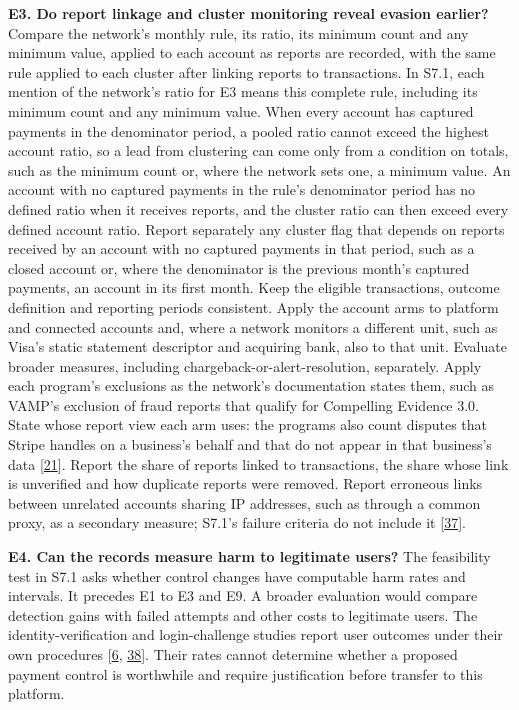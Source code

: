 \documentclass[
  11pt,
]{article}
\begin{document}
\textbf{E3. Do report linkage and cluster monitoring reveal evasion
earlier?} Compare the network's monthly rule, its ratio, its minimum
count and any minimum value, applied to each account as reports are
recorded, with the same rule applied to each cluster after linking
reports to transactions. In S7.1, each mention of the network's ratio
for E3 means this complete rule, including its minimum count and any
minimum value. When every account has captured payments in the
denominator period, a pooled ratio cannot exceed the highest account
ratio, so a lead from clustering can come only from a condition on
totals, such as the minimum count or, where the network sets one, a
minimum value. An account with no captured payments in the rule's
denominator period has no defined ratio when it receives reports, and
the cluster ratio can then exceed every defined account ratio. Report
separately any cluster flag that depends on reports received by an
account with no captured payments in that period, such as a closed
account or, where the denominator is the previous month's captured
payments, an account in its first month. Keep the eligible transactions,
outcome definition and reporting periods consistent. Apply the account
arms to platform and connected accounts and, where a network monitors a
different unit, such as Visa's static statement descriptor and acquiring
bank, also to that unit. Evaluate broader measures, including
chargeback-or-alert-resolution, separately. Apply each program's
exclusions as the network's documentation states them, such as VAMP's
exclusion of fraud reports that qualify for Compelling Evidence 3.0.
State whose report view each arm uses: the programs also count disputes
that Stripe handles on a business's behalf and that do not appear in
that business's data
{[}\protect\hyperlink{ref-Stripe2026MonitoringPrograms}{21}{]}. Report
the share of reports linked to transactions, the share whose link is
unverified and how duplicate reports were removed. Report erroneous
links between unrelated accounts sharing IP addresses, such as through a
common proxy, as a secondary measure; S7.1's failure criteria do not
include it {[}\protect\hyperlink{ref-Liu2018GEM}{37}{]}.

\textbf{E4. Can the records measure harm to legitimate users?} The
feasibility test in S7.1 asks whether control changes have computable
harm rates and intervals. It precedes E1 to E3 and E9. A broader
evaluation would compare detection gains with failed attempts and other
costs to legitimate users. The identity-verification and login-challenge
studies report user outcomes under their own procedures
{[}\protect\hyperlink{ref-Doerfler2019}{6},
\protect\hyperlink{ref-Fatima2024}{38}{]}. Their rates cannot determine
whether a proposed payment control is worthwhile and require
justification before transfer to this platform.
\end{document}
